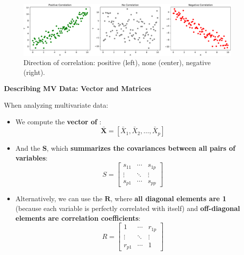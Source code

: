 \begin{figure}[!htp]
    \centering
    \includegraphics[width=\textwidth]{img/correlation.pdf}
    \caption{Direction of correlation: positive (left), none (center), negative (right).}
\end{figure}

\newpage

\begin{flushleft}
    \textcolor{Green3}{ \textbf{Describing MV Data: Vector and Matrices}}
\end{flushleft}
When analyzing multivariate data:
\begin{itemize}
    \item We compute the \textbf{vector of }:
    \begin{equation}
        \bar{\mathbf{X}} = [\bar{X}_{1}, \bar{X}_{2}, \dots, \bar{X}_{p}]
    \end{equation}

    \item And the  $ \mathbf{S} $, which \textbf{summarizes the covariances between all pairs of variables}:
    \begin{equation}
        S =
        \begin{bmatrix}
            s_{11} & \cdots & s_{1p} \\
            \vdots & \ddots & \vdots \\
            s_{p1} & \cdots & s_{pp}
        \end{bmatrix}
    \end{equation}

    \item Alternatively, we can use the  $ \mathbf{R} $, where \textbf{all diagonal elements are 1} (because each variable is perfectly correlated with itself) and \textbf{off-diagonal elements are correlation coefficients}:
    \begin{equation}
        R =
        \begin{bmatrix}
            1      & \cdots & r_{1p} \\
            \vdots & \ddots & \vdots \\
            r_{p1} & \cdots & 1
        \end{bmatrix}
    \end{equation}
\end{itemize}

